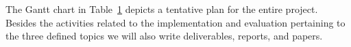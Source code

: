 \begin{table}[t!]
\begin{tabular}{|p{0.80cm}|p{4.80cm}|p{0.40cm}|p{0.40cm}|p{0.40cm}|p{0.40cm}|p{0.40cm}|p{0.40cm}|p{0.40cm}|p{0.40cm}|p{0.40cm}|p{0.40cm}|p{0.40cm}|p{0.40cm}|}
	\end{tabular}
	\label{tab:GanttChart}
\end{table}

The Gantt chart in Table~\ref{tab:GanttChart} depicts a tentative plan for the entire project. %
Besides the activities related to the implementation and evaluation pertaining to the three defined topics %
we will also write deliverables, reports, and %
papers. %











